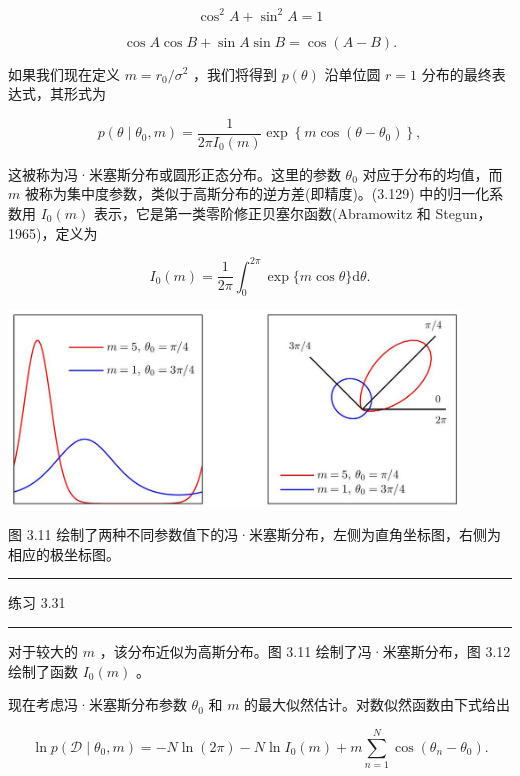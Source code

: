 \documentclass[10pt]{article}
\newcommand{\HRule}{\begin{center}\rule{0.9\linewidth}{0.2mm}\end{center}}
\begin{document}
\[
{\cos }^{2}A + {\sin }^{2}A = 1 \tag{3.127}
\]

\[
\cos A\cos B + \sin A\sin B = \cos \left( {A - B}\right) . \tag{3.128}
\]

如果我们现在定义 \(m = {r}_{0}/{\sigma }^{2}\) ，我们将得到 \(p\left( \theta \right)\) 沿单位圆 \(r = 1\) 分布的最终表达式，其形式为

\[
p\left( {\theta  \mid  {\theta }_{0},m}\right)  = \frac{1}{{2\pi }{I}_{0}\left( m\right) }\exp \left\{  {m\cos \left( {\theta  - {\theta }_{0}}\right) }\right\}  , \tag{3.129}
\]

这被称为冯·米塞斯分布或圆形正态分布。这里的参数 \({\theta }_{0}\) 对应于分布的均值，而 \(m\) 被称为集中度参数，类似于高斯分布的逆方差(即精度)。(3.129) 中的归一化系数用 \({I}_{0}\left( m\right)\) 表示，它是第一类零阶修正贝塞尔函数(Abramowitz 和 Stegun，1965)，定义为

\[
{I}_{0}\left( m\right)  = \frac{1}{2\pi }{\int }_{0}^{2\pi }\exp \{ m\cos \theta \} \mathrm{d}\theta . \tag{3.130}
\]

\begin{center}
\includegraphics[max width=0.9\textwidth]{images/0194e279-9b28-703a-88f4-c3ac21e2010d_111_276_356_1193_517_0.jpg}
\end{center}
\hspace*{3em} 

图 3.11 绘制了两种不同参数值下的冯·米塞斯分布，左侧为直角坐标图，右侧为相应的极坐标图。

\HRule

练习 3.31

\HRule

对于较大的 \(m\) ，该分布近似为高斯分布。图 3.11 绘制了冯·米塞斯分布，图 3.12 绘制了函数 \({I}_{0}\left( m\right)\) 。

现在考虑冯·米塞斯分布参数 \({\theta }_{0}\) 和 \(m\) 的最大似然估计。对数似然函数由下式给出

\[
\ln p\left( {\mathcal{D} \mid  {\theta }_{0},m}\right)  =  - N\ln \left( {2\pi }\right)  - N\ln {I}_{0}\left( m\right)  + m\mathop{\sum }\limits_{{n = 1}}^{N}\cos \left( {{\theta }_{n} - {\theta }_{0}}\right) . \tag{3.131}
\]
\end{document}
